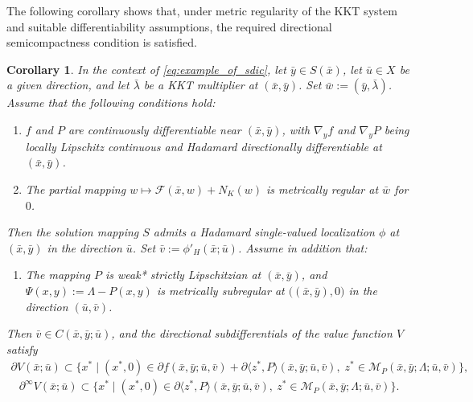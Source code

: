 \documentclass[12pt,twoside,reqno]{amsart}
\newtheorem{corollary}[theorem]{Corollary}
\theoremstyle{definition}
\numberwithin{equation}{section}
\begin{document}
The following corollary shows that, under metric regularity of the KKT system and suitable differentiability assumptions, the required directional semicompactness condition is satisfied. 

\begin{corollary}\label{cor: directional subdifferential kkt polyhedral}
    In the context of \eqref{eq:example_of_sdic}, let
    $\bar{y}\in S(\bar{x})$, let $\bar{u}\in X$ be a given direction,
    and let $\bar{\lambda}$ be a KKT multiplier at 
    $(\bar{x},\bar{y})$. Set $\bar{w}:=(\bar{y},\bar{\lambda})$. 
    Assume that the following conditions hold:
    \begin{enumerate}
        \item[(i)] $f$ and $P$ are continuously differentiable
        near $(\bar{x},\bar{y})$, with $\nabla_y f$ and
        $\nabla_y P$ being locally Lipschitz continuous and Hadamard
        directionally differentiable at $(\bar{x},\bar{y})$.

        \item[(ii)] The partial mapping $w\mapsto\mathcal{F}(\bar{x},w)+N_K(w)$ is metrically regular at $\bar{w}$ for $0$.
    \end{enumerate}
    Then the solution mapping $S$ admits a Hadamard single-valued localization $\phi$ at $(\bar{x},\bar{y})$ in the direction $\bar{u}$. Set $\bar{v}:=\phi'_H(\bar{x};\bar{u})$. 
    Assume in addition that: 
    \begin{enumerate}
        \item[(iii)] The mapping $P$ is weak* strictly Lipschitzian at
        $(\bar{x},\bar{y})$, and $\Psi(x,y):=\Lambda-P(x,y)$ 
        is metrically subregular at
        $\bigl((\bar{x},\bar{y}),0\bigr)$ in the direction
        $(\bar{u},\bar{v})$.
    \end{enumerate}
    Then $\bar{v}\in C(\bar{x},\bar{y};\bar{u})$, and the directional
    subdifferentials of the value function $V$ satisfy
    \begin{equation*}
    \begin{split}
        \partial V(\bar{x};\bar{u})
        \subset
        \Big\{x^*\;\Big|\;
            (x^*,0)\in
            \partial f(\bar{x},\bar{y};\bar{u},\bar{v})
            +\partial\langle z^*,P\rangle
            (\bar{x},\bar{y};\bar{u},\bar{v}),\;
            z^*\in
            \mathcal{M}_P(\bar{x},\bar{y};
            \Lambda;\bar{u},\bar{v})
        \Big\},
    \end{split}
    \end{equation*}
    \begin{equation*}
        \partial^\infty V(\bar{x};\bar{u})
        \subset
        \Big\{x^*\;\Big|\;
            (x^*,0)\in
            \partial\langle z^*,P\rangle
            (\bar{x},\bar{y};\bar{u},\bar{v}),\
            z^*\in
            \mathcal{M}_P(\bar{x},\bar{y};
            \Lambda;\bar{u},\bar{v})
        \Big\}.
    \end{equation*}
\end{corollary}
\end{document}
